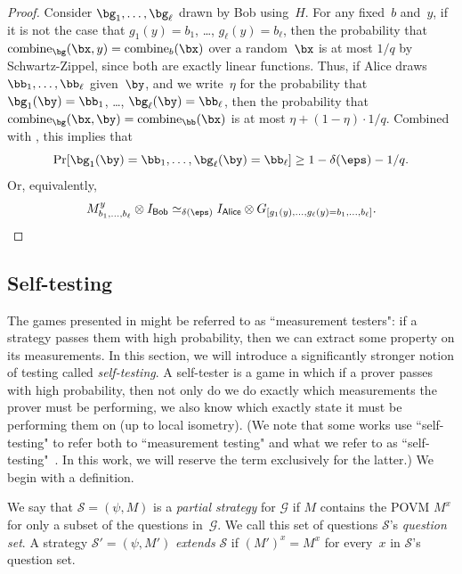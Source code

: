 \documentclass[11pt]{article}
\newcommand{\consistency}{\simeq}
\newcommand{\game}{\mathscr{G}}
\newcommand{\reg}[1]{{\mathsf{#1}}}
\begin{document}
\begin{proof}
Consider $\bg_1, \ldots, \bg_\ell$ drawn by Bob using~$H$.
For any fixed~$b$ and~$y$, if it is not the case that $g_1(y) = b_1$, \ldots, $g_\ell(y) = b_\ell$,
then the probability that $\mathrm{combine}_{\bg}(\bx, y) = \mathrm{combine}_{b}(\bx)$
over a random~$\bx$ is at most $1/q$ by Schwartz-Zippel, since both are exactly linear functions.
Thus, if Alice draws~$\bb_1, \ldots, \bb_\ell$ given~$\by$,
and we write~$\eta$ for the probability that $\bg_1(\by) = \bb_1$, \ldots, $\bg_\ell(\by) = \bb_\ell$,
then the probability that $\mathrm{combine}_{\bg}(\bx, \by) = \mathrm{combine}_{\bb}(\bx)$ is at most
$\eta +  (1-\eta) \cdot 1/q$.
Combined with , this implies that
\begin{equation*}
\Pr[\bg_1(\by) = \bb_1, \ldots, \bg_\ell(\by) = \bb_\ell] \geq 1- \delta(\eps) - 1/q.
\end{equation*}
Or, equivalently,
\begin{equation*}
M^y_{b_1, \ldots, b_\ell} \otimes I_{\reg{Bob}}
\consistency_{\delta(\eps)} I_{\reg{Alice}} \otimes G_{[g_1(y), \ldots, g_\ell(y) = b_1, \ldots, b_\ell]}.\qedhere
\end{equation*}
\end{proof}

\subsection{Self-testing}

The games presented in  might be referred to as ``measurement testers":
if a strategy passes them with high probability, then we can extract some property on its measurements.
In this section, we will introduce a significantly stronger notion of testing called \emph{self-testing}.
A self-tester is a game in which if a prover passes with high probability,
then not only do we do exactly which measurements the prover must be performing,
we also know which exactly state it must be performing them on (up to local isometry).
(We note that some works use ``self-testing" to refer both to ``measurement testing" and what we refer to as ``self-testing"~\cite{NV18a}.
In this work, we will reserve the term exclusively for the latter.) We begin with a definition.

\begin{definition}
We say that $\mathcal{S} = (\psi, M)$ is a \emph{partial strategy} for $\game$
if $M$ contains the POVM $M^x$ for only a subset of the questions in~$\game$.
We call this set of questions $\mathcal{S}$'s \emph{question set}.
A strategy $\mathcal{S}' = (\psi, M')$ \emph{extends} $\mathcal{S}$ if $(M')^x = M^x$ for every~$x$ in $\mathcal{S}$'s question set.
\end{definition}
\end{document}
